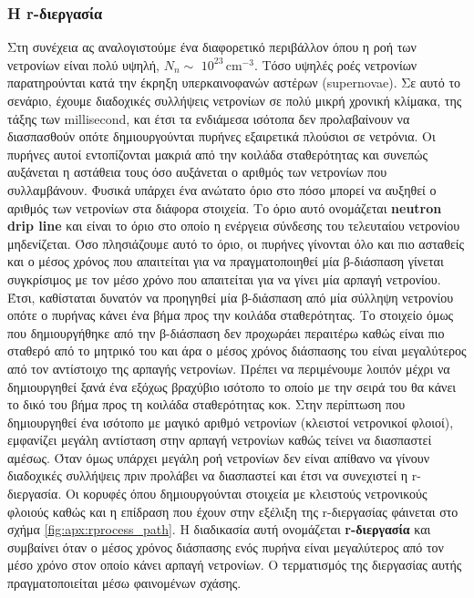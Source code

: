\subsubsection{Η r-διεργασία}
Στη συνέχεια ας αναλογιστούμε ένα διαφορετικό περιβάλλον όπου η ροή των νετρονίων είναι πολύ υψηλή, $N_n \sim$ $10^{23} \,\text{cm}^{-3}$. Τόσο υψηλές ροές νετρονίων παρατηρούνται κατά την έκρηξη υπερκαινοφανών αστέρων (supernovae). Σε αυτό το σενάριο, έχουμε διαδοχικές συλλήψεις νετρονίων σε πολύ μικρή χρονική κλίμακα, της τάξης των millisecond, και έτσι τα ενδιάμεσα ισότοπα δεν προλαβαίνουν να διασπασθούν οπότε δημιουργούνται πυρήνες εξαιρετικά πλούσιοι σε νετρόνια. Οι πυρήνες αυτοί εντοπίζονται μακριά από την κοιλάδα σταθερότητας και συνεπώς αυξάνεται η αστάθεια τους όσο αυξάνεται ο αριθμός των νετρονίων που συλλαμβάνουν. Φυσικά υπάρχει ένα ανώτατο όριο στο πόσο μπορεί να αυξηθεί ο αριθμός των νετρονίων στα διάφορα στοιχεία. Το όριο αυτό ονομάζεται \textbf{neutron drip line} και είναι το όριο στο οποίο η ενέργεια σύνδεσης του τελευταίου νετρονίου μηδενίζεται. 
Όσο πλησιάζουμε αυτό το όριο, οι πυρήνες γίνονται όλο και πιο ασταθείς και ο μέσος χρόνος που απαιτείται για να πραγματοποιηθεί μία β-διάσπαση γίνεται συγκρίσιμος με τον μέσο χρόνο που απαιτείται για να γίνει μία αρπαγή νετρονίου. Έτσι, καθίσταται δυνατόν να προηγηθεί μία β-διάσπαση από μία σύλληψη νετρονίου οπότε ο πυρήνας κάνει ένα βήμα προς την κοιλάδα σταθερότητας. Το στοιχείο όμως που δημιουργήθηκε από την β-διάσπαση δεν προχωράει περαιτέρω καθώς είναι πιο σταθερό από το μητρικό του και άρα ο μέσος χρόνος διάσπασης του είναι μεγαλύτερος από τον αντίστοιχο της αρπαγής νετρονίων. Πρέπει να περιμένουμε λοιπόν μέχρι να δημιουργηθεί ξανά ένα εξόχως βραχύβιο ισότοπο το οποίο με την σειρά του θα κάνει το δικό του βήμα προς τη κοιλάδα σταθερότητας κοκ. 
Στην περίπτωση που δημιουργηθεί ένα ισότοπο με μαγικό αριθμό νετρονίων (κλειστοί νετρονικοί φλοιοί), εμφανίζει μεγάλη αντίσταση στην αρπαγή νετρονίων καθώς τείνει να διασπαστεί αμέσως. Όταν όμως υπάρχει μεγάλη ροή νετρονίων δεν είναι απίθανο να γίνουν διαδοχικές συλλήψεις πριν προλάβει να διασπαστεί και έτσι να συνεχιστεί η r-διεργασία. Οι κορυφές όπου δημιουργούνται στοιχεία με κλειστούς νετρονικούς φλοιούς καθώς και η επίδραση που έχουν στην εξέλιξη της r-διεργασίας φάινεται στο σχήμα \ref{fig:apx:rprocess_path}.
Η διαδικασία αυτή ονομάζεται \textbf{r-διεργασία} και συμβαίνει όταν ο μέσος χρόνος διάσπασης ενός πυρήνα είναι μεγαλύτερος από τον μέσο χρόνο στον οποίο κάνει αρπαγή νετρονίων. Ο τερματισμός της διεργασίας αυτής πραγματοποιείται μέσω φαινομένων σχάσης.

